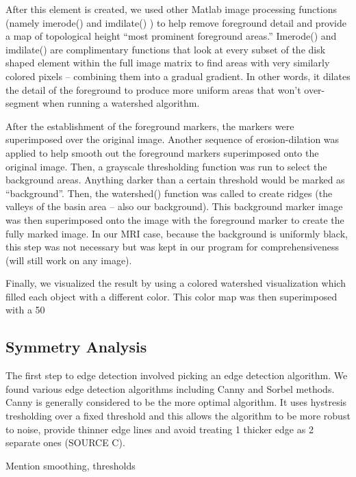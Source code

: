 \documentclass[12pt]{article}
\theoremstyle{plain}%
\theoremstyle{definition}
\theoremstyle{remark}
\begin{document}
After this element is created, we used other Matlab image processing functions (namely imerode() and imdilate() ) to help remove foreground detail and provide a map of topological height “most prominent foreground areas.”  Imerode() and imdilate() are complimentary functions that look at every subset of the disk shaped element within the full image matrix to find areas with very similarly colored pixels – combining them into a gradual gradient.  In other words, it dilates the detail of the foreground to produce more uniform areas that won’t over-segment when running a watershed algorithm. 

After the establishment of the foreground markers, the markers were superimposed over the original image.  Another sequence of erosion-dilation was applied to help smooth out the foreground markers superimposed onto the original image.  Then, a grayscale thresholding function was run to select the background areas.  Anything darker than a certain threshold would be marked as “background”.  Then, the watershed() function was called to create ridges (the valleys of the basin area – also our background).  This background marker image was then superimposed onto the image with the foreground marker to create the fully marked image.  In our MRI case, because the background is uniformly black, this step was not necessary but was kept in our program for comprehensiveness (will still work on any image).

Finally, we visualized the result by using a colored watershed visualization which filled each object with a different color.  This color map was then superimposed with a 50%
	
\subsection{Symmetry Analysis}

The first step to edge detection involved picking an edge detection algorithm.  We found various edge detection algorithms including Canny and Sorbel methods.  Canny is generally considered to be the more optimal algorithm.  It uses hystresis tresholding over a fixed threshold and this allows the algorithm to be more robust to noise, provide thinner edge lines and avoid treating 1 thicker edge as 2 separate ones (SOURCE C).  

Mention smoothing, thresholds
\end{document}
